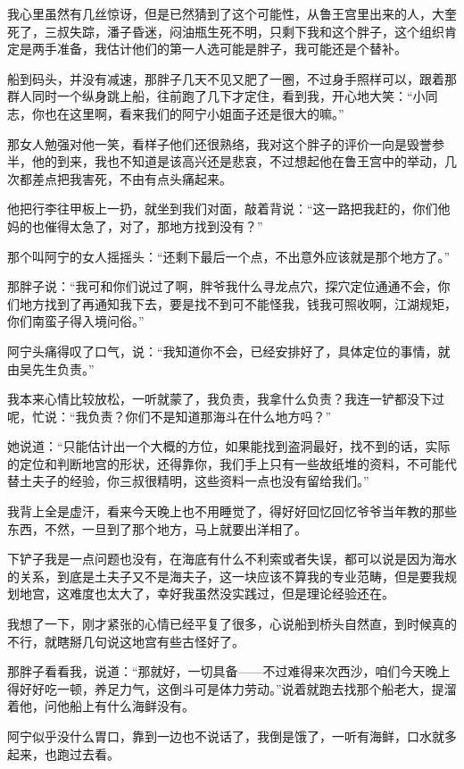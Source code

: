 我心里虽然有几丝惊讶，但是已然猜到了这个可能性，从鲁王宫里出来的人，大奎死了，三叔失踪，潘子昏迷，闷油瓶生死不明，只剩下我和这个胖子，这个组织肯定是两手准备，我估计他们的第一人选可能是胖子，我可能还是个替补。

船到码头，并没有减速，那胖子几天不见又肥了一圈，不过身手照样可以，跟着那群人同时一个纵身跳上船，往前跑了几下才定住，看到我，开心地大笑：“小同志，你也在这里啊，看来我们的阿宁小姐面子还是很大的嘛。”

那女人勉强对他一笑，看样子他们还很熟络，我对这个胖子的评价一向是毁誉参半，他的到来，我也不知道是该高兴还是悲哀，不过想起他在鲁王宫中的举动，几次都差点把我害死，不由有点头痛起来。

他把行李往甲板上一扔，就坐到我们对面，敲着背说：“这一路把我赶的，你们他妈的也催得太急了，对了，那地方找到没有？”

那个叫阿宁的女人摇摇头：“还剩下最后一个点，不出意外应该就是那个地方了。”

那胖子说：“我可和你们说过了啊，胖爷我什么寻龙点穴，探穴定位通通不会，你们地方找到了再通知我下去，要是找不到可不能怪我，钱我可照收啊，江湖规矩，你们南蛮子得入境问俗。”

阿宁头痛得叹了口气，说：“我知道你不会，已经安排好了，具体定位的事情，就由吴先生负责。”

我本来心情比较放松，一听就蒙了，我负责，我拿什么负责？我连一铲都没下过呢，忙说：“我负责？你们不是知道那海斗在什么地方吗？”

她说道：“只能估计出一个大概的方位，如果能找到盗洞最好，找不到的话，实际的定位和判断地宫的形状，还得靠你，我们手上只有一些故纸堆的资料，不可能代替土夫子的经验，你三叔很精明，这些资料一点也没有留给我们。”

我背上全是虚汗，看来今天晚上也不用睡觉了，得好好回忆回忆爷爷当年教的那些东西，不然，一旦到了那个地方，马上就要出洋相了。

下铲子我是一点问题也没有，在海底有什么不利索或者失误，都可以说是因为海水的关系，到底是土夫子又不是海夫子，这一块应该不算我的专业范畴，但是要我规划地宫，这难度也太大了，幸好我虽然没实践过，但是理论经验还在。

我想了一下，刚才紧张的心情已经平复了很多，心说船到桥头自然直，到时候真的不行，就瞎掰几句说这地宫有些古怪好了。

那胖子看看我，说道：“那就好，一切具备——不过难得来次西沙，咱们今天晚上得好好吃一顿，养足力气，这倒斗可是体力劳动。”说着就跑去找那个船老大，提溜着他，问他船上有什么海鲜没有。

阿宁似乎没什么胃口，靠到一边也不说话了，我倒是饿了，一听有海鲜，口水就多起来，也跑过去看。

